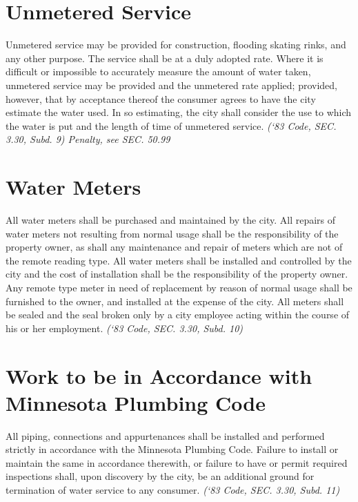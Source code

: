 \documentclass[code.tex]{subfiles}
\begin{document}
\section{Unmetered Service}
Unmetered service may be provided for construction, flooding skating rinks, and any other purpose.  The service shall be at a duly adopted rate.  Where it is difficult or impossible to accurately measure the amount of water taken, unmetered service may be provided and the unmetered rate applied; provided, however, that by acceptance thereof the consumer agrees to have the city estimate the water used.  In so estimating, the city shall consider the use to which the water is put and the length of time of unmetered service.\newline
\emph{(‘83 Code, SEC. 3.30, Subd. 9) Penalty, see SEC. 50.99}
\section{Water Meters}
All water meters shall be purchased and maintained by the city.  All repairs of water meters not resulting from normal usage shall be the responsibility of the property owner, as shall any maintenance and repair of meters which are not of the remote reading type.  All water meters shall be installed and controlled by the city and the cost of installation shall be the responsibility of the property owner.  Any remote type meter in need of replacement by reason of normal usage shall be furnished to the owner, and installed at the expense of the city.  All meters shall be sealed and the seal broken only by a city employee acting within the course of his or her employment.\newline
\emph{(‘83 Code, SEC. 3.30, Subd. 10)}
\section{Work to be in Accordance with Minnesota Plumbing Code}
All piping, connections and appurtenances shall be installed and performed strictly in accordance with the Minnesota Plumbing Code.  Failure to install or maintain the same in accordance therewith, or failure to have or permit required inspections shall, upon discovery by the city, be an additional ground for termination of water service to any consumer.\newline
\emph{(‘83 Code, SEC. 3.30, Subd. 11)}
\end{document}
